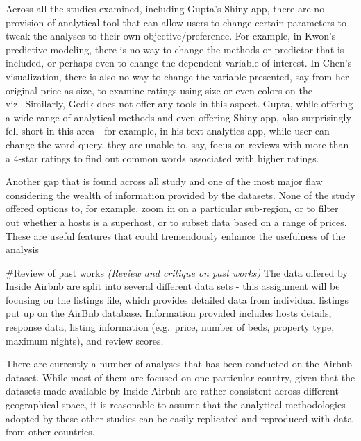 \documentclass{acm_proc_article-sp}
\begin{document}
Across all the studies examined, including Gupta's Shiny app, there are
no provision of analytical tool that can allow users to change certain
parameters to tweak the analyses to their own objective/preference. For
example, in Kwon's predictive modeling, there is no way to change the
methods or predictor that is included, or perhaps even to change the
dependent variable of interest. In Chen's visualization, there is also
no way to change the variable presented, say from her original
price-as-size, to examine ratings using size or even colors on the
viz.~Similarly, Gedik does not offer any tools in this aspect. Gupta,
while offering a wide range of analytical methods and even offering
Shiny app, also surprisingly fell short in this area - for example, in
his text analytics app, while user can change the word query, they are
unable to, say, focus on reviews with more than a 4-star ratings to find
out common words associated with higher ratings.

Another gap that is found across all study and one of the most major
flaw considering the wealth of information provided by the datasets.
None of the study offered options to, for example, zoom in on a
particular sub-region, or to filter out whether a hosts is a superhost,
or to subset data based on a range of prices. These are useful features
that could tremendously enhance the usefulness of the analysis

\#Review of past works \emph{(Review and critique on past works)} The
data offered by Inside Airbnb are split into several different data sets
- this assignment will be focusing on the listings file, which provides
detailed data from individual listings put up on the AirBnb database.
Information provided includes hosts details, response data, listing
information (e.g.~price, number of beds, property type, maximum nights),
and review scores.

There are currently a number of analyses that has been conducted on the
Airbnb dataset. While most of them are focused on one particular
country, given that the datasets made available by Inside Airbnb are
rather consistent across different geographical space, it is reasonable
to assume that the analytical methodologies adopted by these other
studies can be easily replicated and reproduced with data from other
countries.
\end{document}
